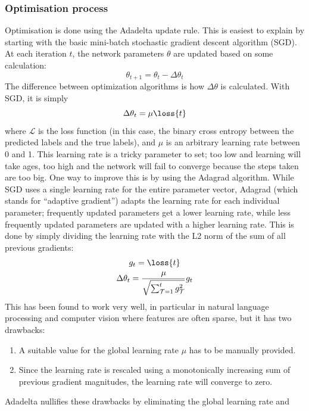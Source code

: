 \subsubsection{Optimisation process}
Optimisation is done using the Adadelta update rule\citep{adadelta}. This is
easiest to explain by starting with the basic mini-batch stochastic gradient
descent algorithm (SGD). At each iteration $t$, the network parameters $\theta$
are updated based on some calculation:
\begin{equation}
  \theta_{t+1} = \theta_{t} - \Delta\theta_t
\end{equation}
The difference between optimization algorithms is how $\Delta\theta$ is
calculated. With SGD, it is simply
\begin{equation}
  \Delta\theta_t = \mu \loss{t}
\end{equation}
where $\mathcal{L}$ is the loss function (in this case, the binary cross entropy
between the predicted labels and the true labels), and $\mu$ is an arbitrary
learning rate between 0 and 1. This learning rate is a tricky parameter to set;
too low and learning will take ages, too high and the network will fail to
converge because the steps taken are too big. One way to improve this is by
using the Adagrad\citep{adagrad} algorithm. While SGD uses a single learning
rate for the entire parameter vector, Adagrad (which stands for ``adaptive
gradient'') adapts the learning rate for each individual parameter; frequently
updated parameters get a lower learning rate, while less frequently updated
parameters are updated with a higher learning rate. This is done by simply
dividing the learning rate with the L2 norm of the sum of all previous gradients:
\begin{gather}
  g_{t} = \loss{t} \\
  \Delta\theta_t = \frac{\mu}{\sqrt{\sum^{t}_{\mathcal{T}=1}g_{\mathcal{T}}^2}} g_{t}
\end{gather}
This has been found to work very well, in particular in natural language
processing and computer vision where features are often sparse, but it has two
drawbacks:
\begin{enumerate}
  \item A suitable value for the global learning rate $\mu$ has to be
    manually provided.
  \item Since the learning rate is rescaled using a monotonically increasing sum of
    previous gradient magnitudes, the learning rate will converge to zero.
\end{enumerate}
Adadelta nullifies these drawbacks by eliminating the global learning rate and
